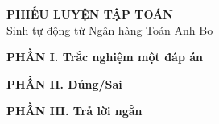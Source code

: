 \documentclass[12pt,a4paper]{article}
\newcounter{cau}
\newcommand{\phan}[2]{
  \vspace{6pt}
  \par\noindent\large\textbf{PHẦN #1. #2}
  \normalsize
  \vspace{4pt}
}
\begin{document}
\begin{center}
{\Large\textbf{PHIẾU LUYỆN TẬP TOÁN}}\\[4pt]
{\normalsize Sinh tự động từ Ngân hàng Toán Anh Bo}
\end{center}

\phan{I}{Trắc nghiệm một đáp án}


\phan{II}{Đúng/Sai}
\setcounter{cau}{0}


\phan{III}{Trả lời ngắn}
\setcounter{cau}{0}

\end{document}
